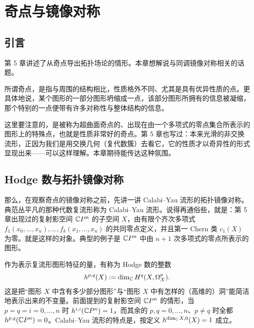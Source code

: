 \renewcommand{\thesection}{\arabic{section}}
\chapter{奇点与镜像对称}

\section{引言}

第 5 章讲述了从奇点导出拓扑场论的情形。本章想解说与同调镜像对称相关的话题。

所谓奇点，是指与周围的结构相比，性质格外不同、尤其是具有优异性质的点。更具体地说，某个图形的一部分图形坍缩成一点，该部分图形所拥有的信息被凝缩，那个特别的一点便带有许多对称性与整体结构的信息。

这里要注意的，是被称为超曲面奇点的、出现在由一个多项式的零点集合所表示的图形上的特殊点，也就是性质非常好的奇点。第 5 章也写过：本来光滑的非交换流形，正因为我们是用交换几何（复代数簇）去看它，它的性质才以奇异性的形式显现出来——可以这样理解。本章期待能传达这种氛围。

\section{Hodge 数与拓扑镜像对称}

那么，在观察奇点的镜像对称之前，先讲一讲 Calabi--Yau 流形的拓扑镜像对称。典范丛平凡的那种代数复流形称为 Calabi--Yau 流形。说得再通俗些，就是：第 5 章出现过的复射影空间 $\mathbb{C}P^n$ 的子空间 $X$，由有限个齐次多项式 $f_1(x_0,\dots,x_n),\dots,f_k(x_1,\dots,x_n)$ 的共同零点定义，并且第一 Chern 类 $c_1(X)$ 为零。就是这样的对象。典型的例子是 $\mathbb{C}P^n$ 中由 $n+1$ 次多项式的零点所表示的图形。

作为表示复流形图形特征的量，有称为 Hodge 数的整数
%
\[
  h^{p,q}(X):=\dim_{\mathbb{C}}H^{q}(X,\Omega_X^{p}).
\]
%
这是把“图形 $X$ 中含有多少部分图形”与“图形 $X$ 中有怎样的（高维的）洞”能简洁地表示出来的不变量。前面提到的复射影空间 $\mathbb{C}P^n$ 的情形，当 $p=q=i=0,\dots,n$ 时 $h^{i,i}(\mathbb{C}P^n)=1$，而其余的 $p,q=0,\dots,n$、$p\ne q$ 时全都 $h^{p,q}(\mathbb{C}P^n)=0$。Calabi--Yau 流形的特点是，按定义 $h^{\dim_{\mathbb{C}}X,0}(X)=1$ 成立。

